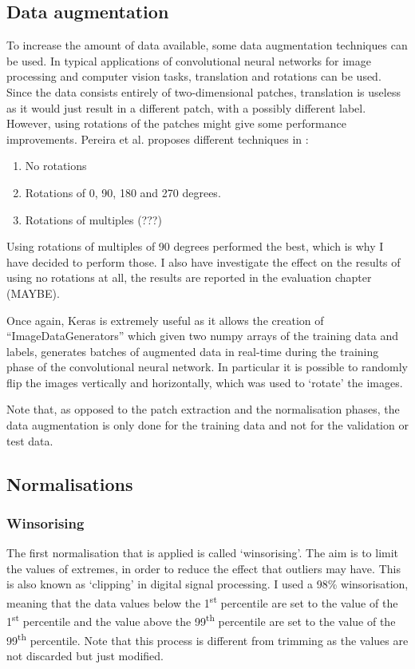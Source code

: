 \documentclass[12pt,a4paper,twoside,openright]{report}
\begin{document}
\subsection{Data augmentation}
To increase the amount of data available, some data augmentation techniques can be used. In typical applications of convolutional neural networks for image processing and computer vision tasks, translation and rotations can be used. Since the data consists entirely of two-dimensional patches, translation is useless as it would just result in a different patch, with a possibly different label. However, using rotations of the patches might give some performance improvements. Pereira et al. proposes different techniques in \cite{pereira}:
\begin{enumerate}
	\item No rotations
	\item Rotations of 0, 90, 180 and 270 degrees.
	\item Rotations of multiples (???)
\end{enumerate}
Using rotations of multiples of 90 degrees performed the best, which is why I have decided to perform those. I also have investigate the effect on the results of using no rotations at all, the results are reported in the evaluation chapter (MAYBE).

Once again, Keras is extremely useful as it allows the creation of ``ImageDataGenerators'' which given two numpy arrays of the training data and labels, generates batches of augmented data in real-time during the training phase of the convolutional neural network. In particular it is possible to randomly flip the images vertically and horizontally, which was used to `rotate' the images.

Note that, as opposed to the patch extraction and the normalisation phases, the data augmentation is only done for the training data and not for the validation or test data.

\subsection{Normalisations}
\subsubsection{Winsorising}
The first normalisation that is applied is called `winsorising'. The aim is to limit the values of extremes, in order to reduce the effect that outliers may have. This is also known as `clipping' in digital signal processing. I used a 98\% winsorisation, meaning that the data values below the 1\textsuperscript{st} percentile are set to the value of the 1\textsuperscript{st} percentile and the value above the 99\textsuperscript{th} percentile are set to the value of the 99\textsuperscript{th} percentile. Note that this process is different from trimming as the values are not discarded but just modified.
\end{document}
